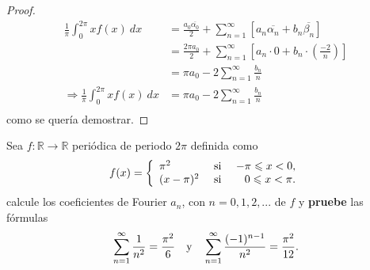 \documentclass[12pt]{report}
\theoremstyle{largebreak}
\renewcommand{\leq}{\ensuremath{\leqslant}}
\newcommand\cf[3]{\ensuremath{#1:#2\rightarrow#3}}
\begin{document}
\begin{proof}
        \begin{equation*}
            \begin{split}
                \frac{1}{\pi}\int_{0}^{2\pi}xf(x)\:dx&=\frac{a_0\overline{\alpha_0}}{2}+\sum_{n=1}^\infty\left[a_n\overline{\alpha_n}+b_n\overline{\beta_n}\right]\\
                &=\frac{2\pi a_0}{2}+\sum_{n=1}^\infty\left[a_n\cdot 0+b_n\cdot\left(\frac{-2}{n}\right)\right]\\
                &=\pi a_0-2\sum_{ n=1}^\infty\frac{b_n}{n}\\
                \Rightarrow \frac{1}{\pi}\int_{0}^{2\pi}xf(x)\:dx&=\pi a_0-2\sum_{ n=1}^\infty\frac{b_n}{n}\\
            \end{split}
        \end{equation*}
        como se quería demostrar.
    \end{proof}

    \begin{excer}
        Sea $\cf{f}{\mathbb{R}}{\mathbb{R}}$ periódica de periodo $2\pi$ definida como
        \begin{equation*}
            f(x)=\left\{
                \begin{array}{lcr}
                    \pi^2 & \textup{ si } & -\pi\leq x<0,\\
                    (x-\pi)^2 & \textup{ si } & 0\leq x <\pi.
                \end{array}
            \right.
        \end{equation*}
        calcule los coeficientes de Fourier $a_n$, con $n=0,1,2,...$ de $f$ y \textbf{pruebe} las fórmulas
        \begin{equation*}
            \sum_{ n=1}^\infty\frac{1}{n^2}=\frac{\pi^2}{6}\quad\textup{y}\quad\sum_{ n=1}^\infty\frac{(-1)^{ n-1}}{n^2}=\frac{\pi^2}{12}.
        \end{equation*}
    \end{excer}
\end{document}
